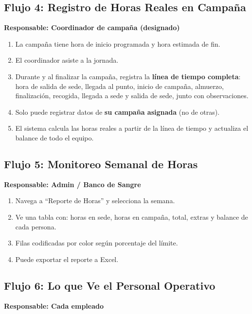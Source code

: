 \documentclass[9pt,a4paper]{extarticle}
\begin{document}
\subsection{Flujo 4: Registro de Horas Reales en Campaña}

\textbf{Responsable: Coordinador de campaña (designado)}

\begin{enumerate}[leftmargin=2em]
    \item La campaña tiene hora de inicio programada y hora estimada de fin.
    \item El coordinador asiste a la jornada.
    \item Durante y al finalizar la campaña, registra la \textbf{l\'{i}nea de tiempo completa}: hora de salida de sede, llegada al punto, inicio de campaña, almuerzo, finalizaci\'{o}n, recogida, llegada a sede y salida de sede, junto con observaciones.
    \item Solo puede registrar datos de \textbf{su campaña asignada} (no de otras).
    \item El sistema calcula las horas reales a partir de la l\'{i}nea de tiempo y actualiza el balance de todo el equipo.
\end{enumerate}

\subsection{Flujo 5: Monitoreo Semanal de Horas}

\textbf{Responsable: Admin / Banco de Sangre}

\begin{enumerate}[leftmargin=2em]
    \item Navega a ``Reporte de Horas'' y selecciona la semana.
    \item Ve una tabla con: horas en sede, horas en campaña, total, extras y balance de cada persona.
    \item Filas codificadas por color seg\'{u}n porcentaje del l\'{i}mite.
    \item Puede exportar el reporte a Excel.
\end{enumerate}

\subsection{Flujo 6: Lo que Ve el Personal Operativo}

\textbf{Responsable: Cada empleado}
\end{document}
